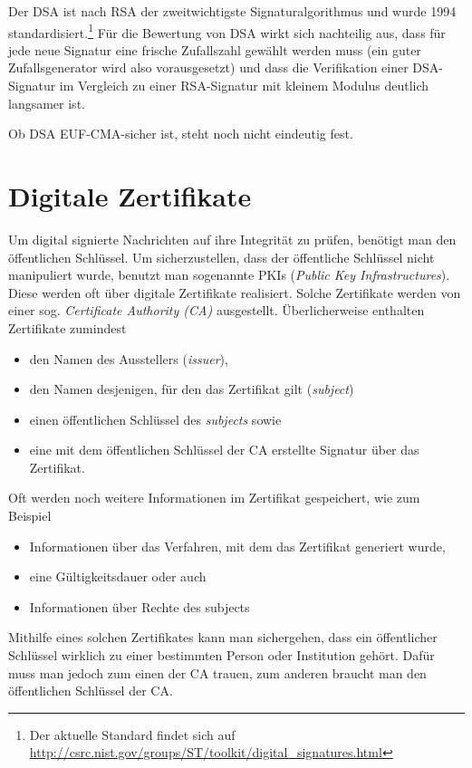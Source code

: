 Der DSA ist nach RSA der zweitwichtigste Signaturalgorithmus und wurde
1994 standardisiert.\footnote{Der aktuelle Standard findet sich auf
  \url{http://csrc.nist.gov/groups/ST/toolkit/digital_signatures.html}}
Für die Bewertung von DSA wirkt sich nachteilig aus, dass für jede neue
Signatur eine frische Zufallszahl gewählt werden muss (ein guter
Zufallsgenerator wird also vorausgesetzt) und dass die Verifikation
einer DSA-Signatur im Vergleich zu einer RSA-Signatur mit kleinem
Modulus deutlich langsamer ist.

Ob DSA EUF-CMA-sicher ist, steht noch nicht eindeutig fest.

\section{Digitale Zertifikate}
\indexDigitalCert Um digital signierte Nachrichten auf ihre Integrität
zu prüfen, benötigt man den öffentlichen Schlüssel. Um sicherzustellen,
dass der öffentliche Schlüssel nicht manipuliert wurde, benutzt man
sogenannte PKIs (\emph{Public Key Infrastructures}). Diese werden oft
über digitale Zertifikate realisiert. Solche Zertifikate werden von
einer sog. \emph{Certificate Authority (CA)} \indexCertAuthority
ausgestellt. Überlicherweise enthalten Zertifikate zumindest
\begin{itemize}
\item den Namen des Ausstellers (\emph{issuer}),
\item den Namen desjenigen, für den das Zertifikat gilt (\emph{subject})
\item einen öffentlichen Schlüssel des \emph{subjects} sowie
\item eine mit dem öffentlichen Schlüssel der CA erstellte Signatur über
  das Zertifikat.
\end{itemize} Oft werden noch weitere Informationen im Zertifikat
gespeichert, wie zum Beispiel
\begin{itemize}
\item Informationen über das Verfahren, mit dem das Zertifikat generiert
  wurde,
\item eine Gültigkeitsdauer oder auch
\item Informationen über Rechte des subjects
\end{itemize}

Mithilfe eines solchen Zertifikates kann man sichergehen, dass ein
öffentlicher Schlüssel wirklich zu einer bestimmten Person oder
Institution gehört. Dafür muss man jedoch zum einen der CA
\indexCertAuthority trauen, zum anderen braucht man den öffentlichen
Schlüssel der CA.

